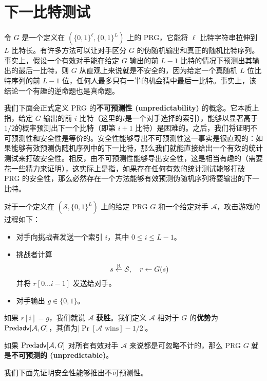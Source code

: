 \section{下一比特测试}

令 $G$ 是一个定义在 $(\{0,1\}^\ell,\{0,1\}^L)$ 上的 PRG，它能将 $\ell$ 比特字符串拉伸到 $L$ 比特长。有许多方法可以让对手区分 $G$ 的伪随机输出和真正的随机比特序列。事实上，假设一个有效对手能在给定 $G$ 输出的前 $L-1$ 比特的情况下预测出其输出的最后一比特，则 $G$ 从直观上来说就是不安全的，因为给定一个真随机 $L$ 位比特序列的前 $L-1$ 位，任何人最多只有一半的机会猜中最后一比特。事实上，该结论一个有趣的逆命题也是真命题。

我们下面会正式定义 PRG 的\textbf{不可预测性 (unpredictability)} 的概念。它本质上指，给定 $G$ 输出的前 $i$ 比特（这里的$i$是一个对手选择的索引），能够以显著高于$1/2$的概率预测出下一个比特（即第 $i+1$ 比特）是困难的。之后，我们将证明不可预测性和安全性是等价的。安全性能够导出不可预测性这一事实是很直观的：如果能够有效预测伪随机序列中的下一比特，那么我们就能直接给出一个有效的统计测试来打破安全性。相反，由不可预测性能够导出安全性，这是相当有趣的（需要花一些精力来证明），这实际上是指，如果存在任何有效的统计测试能够打破 PRG 的安全性，那么必然存在一个方法能够有效预测伪随机序列将要输出的下一比特。

\begin{game}\label{game:3-2}
对于一个定义在 $(\mathcal{S},\{0,1\}^L)$ 上的给定 PRG $G$ 和一个给定对手 $\mathcal{A}$，攻击游戏的过程如下：
\begin{itemize}
	\item 对手向挑战者发送一个索引 $i$，其中 $0\leq i\leq L-1$。
	\item 挑战者计算
	\[
	s\overset{\rm R}\leftarrow\mathcal{S},
	\quad
	r\leftarrow G(s)
	\]
	并将 $r[0\dots i-1]$ 发送给对手。
	\item 对手输出 $g\in\{0,1\}$。
\end{itemize}
如果 $r[i]=g$，我们就说 $\mathcal{A}$ \textbf{获胜}。我们定义 $\mathcal{A}$ 相对于 $G$ 的\textbf{优势}为 ${\rm Pred\mathsf{adv}}[\mathcal{A},G]$，其值为$|\Pr[\mathcal{A}\text{ wins}]-{1}/{2}|$。
\end{game}

\begin{definition}
如果 ${\rm Pred\mathsf{adv}}[\mathcal{A},G]$ 对所有有效对手 $\mathcal{A}$ 来说都是可忽略不计的，那么 PRG $G$ 就是\textbf{不可预测的 (unpredictable)}。
\end{definition}

我们下面先证明安全性能够推出不可预测性。


